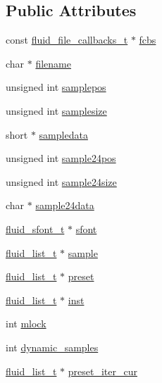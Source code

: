 \subsection*{Public Attributes}
\begin{DoxyCompactItemize}
\item 
const \hyperlink{types_8h_a6a223e4b8d83753d95c87e1feed58227}{fluid\+\_\+file\+\_\+callbacks\+\_\+t} $\ast$ \hyperlink{struct__fluid__defsfont__t_ae78f94e5815c8a7daf73916f63b391a0}{fcbs}
\item 
char $\ast$ \hyperlink{struct__fluid__defsfont__t_a3c8383fe342b4572d39b6655854fbd0f}{filename}
\item 
unsigned int \hyperlink{struct__fluid__defsfont__t_a7dfd41e3bb8cd63cf9c10d168597bc47}{samplepos}
\item 
unsigned int \hyperlink{struct__fluid__defsfont__t_a0e31704a1a08094fdbb8a52d34978597}{samplesize}
\item 
short $\ast$ \hyperlink{struct__fluid__defsfont__t_a681b14f9f5f55cad164a9772e3c24799}{sampledata}
\item 
unsigned int \hyperlink{struct__fluid__defsfont__t_a80d20a1f381fdcca679536eb3c495515}{sample24pos}
\item 
unsigned int \hyperlink{struct__fluid__defsfont__t_a57f71bef06db12ccb3dbcbb05e92b6bf}{sample24size}
\item 
char $\ast$ \hyperlink{struct__fluid__defsfont__t_a33177bce06851265e920871c1fe0e3a5}{sample24data}
\item 
\hyperlink{types_8h_aa6c18288f76608acbb10b80a153f4ab8}{fluid\+\_\+sfont\+\_\+t} $\ast$ \hyperlink{struct__fluid__defsfont__t_a8e1269657bcfc41386c16d0afee66bfe}{sfont}
\item 
\hyperlink{fluid__list_8h_a3ef7535d4290862c0af118569223bd89}{fluid\+\_\+list\+\_\+t} $\ast$ \hyperlink{struct__fluid__defsfont__t_af755f0c3f0fc02eb14bd70a50eb00019}{sample}
\item 
\hyperlink{fluid__list_8h_a3ef7535d4290862c0af118569223bd89}{fluid\+\_\+list\+\_\+t} $\ast$ \hyperlink{struct__fluid__defsfont__t_ade9d658a84649022b884db9c73888b73}{preset}
\item 
\hyperlink{fluid__list_8h_a3ef7535d4290862c0af118569223bd89}{fluid\+\_\+list\+\_\+t} $\ast$ \hyperlink{struct__fluid__defsfont__t_aed0ba33a803a6924426846b62d756372}{inst}
\item 
int \hyperlink{struct__fluid__defsfont__t_a3b53f413ad87f473cb41ade75efaede6}{mlock}
\item 
int \hyperlink{struct__fluid__defsfont__t_a1282ea7ed390d947edda342d8820c7bf}{dynamic\+\_\+samples}
\item 
\hyperlink{fluid__list_8h_a3ef7535d4290862c0af118569223bd89}{fluid\+\_\+list\+\_\+t} $\ast$ \hyperlink{struct__fluid__defsfont__t_a4ffede8ee7314ad0de689fa06d7a2034}{preset\+\_\+iter\+\_\+cur}
\end{DoxyCompactItemize}


